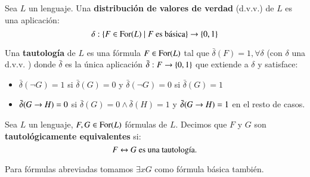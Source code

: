 \begin{dfn}
    Sea $L$ un lenguaje.
    Una \textbf{distribución de valores de verdad} (d.v.v.) de $L$ es una aplicación:
    $$
        \delta: \left\{F \in \mathrm{For}(L) \mid F \text{ es básica}\right\} \to \left\{0, 1\right\}
    $$
\end{dfn}

\begin{dfn}[Tautología]
    Una \textbf{tautología} de $L$ es una fórmula $F \in \mathrm{For}(L)$ tal que $\bar \delta(F) = 1, \forall \delta$ (con $\delta$ una d.v.v. ) donde $\bar \delta$ es la única aplicación $\bar\delta: F \to \left\{0, 1\right\}$ que extiende a $\delta$ y satisface:
    \begin{itemize}
        \item $\bar\delta(\neg G) = 1$ si $\bar\delta(G) = 0$ y $\bar\delta(\neg G) = 0$ si $\bar\delta(G) = 1$
        \item $\bar\delta(G \rightarrow H) = 0$ si $\bar\delta(G) = 0 \land \bar\delta(H) = 1$ y $\bar\delta(G \rightarrow H) = 1$ en el resto de casos.
    \end{itemize}
\end{dfn}

\begin{dfn}
    Sea $L$ un lenguaje, $F, G \in \mathrm{For}(L)$ fórmulas de $L$. Decimos que $F$ y $G$ son \textbf{tautológicamente equivalentes} si:
    $$
        F \leftrightarrow G \text{ es una tautología.}
    $$
\end{dfn}

\begin{obs}
    Para fórmulas abreviadas tomamos $\exists x G$ como fórmula básica también.
\end{obs}

